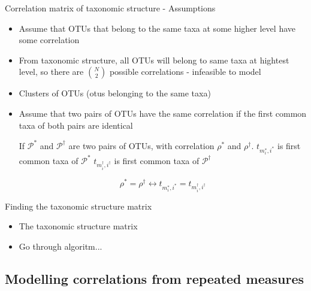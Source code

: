 \documentclass{beamer}
\begin{document}
\begin{frame}[t]{Correlation matrix of taxonomic structure - Assumptions}
  \begin{itemize}
    \item Assume that OTUs that belong to the same taxa at some higher level have some correlation
    \item From taxonomic structure, all OTUs will belong to same taxa at hightest level, so there are $\binom{N}{2}$ possible correlations - infeasible to model
    \item Clusters of OTUs (otus belonging to the same taxa)
    \item Assume that two pairs of OTUs have the same correlation if the first common taxa of both pairs are identical

    If $\mathcal{P}^*$ and $\mathcal{P}^\dagger$ are two pairs of OTUs, with correlation $\rho^*$ and $\rho^\dagger$. $t_{m_i^*, i^*}$ is first common taxa of $\mathcal{P}^*$ $t_{m_i^\dagger, i^\dagger}$ is first common taxa of $\mathcal{P}^\dagger$

    $$\rho^* = \rho^\dagger \leftrightarrow t_{m_i^*, i^*} = t_{m_i^\dagger, i^\dagger}$$
  \end{itemize}
\end{frame}




\begin{frame}[t]{Finding the taxonomic structure matrix}
  \begin{itemize}
    \item The taxonomic structure matrix
    \item Go through algoritm...
  \end{itemize}
\end{frame}



\subsection{Modelling correlations from repeated measures}
\end{document}
